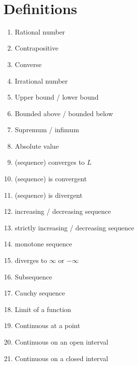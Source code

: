 \documentclass[12pt]{amsart}
\begin{document}

\

\section*{Definitions}

\begin{enumerate}
	\item Rational number
	\item Contrapositive
	\item Converse
	\item Irrational number
	\item Upper bound / lower bound
	\item Bounded above / bounded below
	\item Supremum / infimum
	\item Absolute value
	\item (sequence) converges to $L$

	\item (sequence) is convergent
	\item (sequence) is divergent

	\item increasing / decreasing sequence
	\item strictly increasing / decreasing sequence
	\item monotone sequence
	\item diverges to $\infty$ or $-\infty$				
	\item Subsequence
	

	\item Cauchy sequence

	\item Limit of a function

	\item Continuous at a point
				\item Continuous on an open interval
	\item Continuous on a closed interval
		\begin{comment}

	\item Differentiable
	\item Derivative (at a point)
	\item Derivative (function)
	\item Increasing/decreasing function
	\end{comment}
\end{enumerate}
\end{document}
